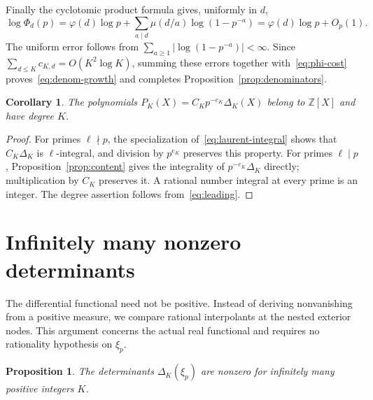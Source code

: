 \documentclass[11pt,letterpaper]{article}
\numberwithin{equation}{section}
\newtheorem{proposition}[theorem]{Proposition}
\newtheorem{corollary}[theorem]{Corollary}
\theoremstyle{remark}
\newcommand{\Z}{\mathbb Z}
\begin{document}
Finally the cyclotomic product formula gives, uniformly in $d$,
\begin{equation*}
 \log\Phi_d(p)=\varphi(d)\log p
    +\sum_{a\mid d}\mu(d/a)\log(1-p^{-a})
    =\varphi(d)\log p+O_p(1).
\end{equation*}
The uniform error follows from $\sum_{a\ge1}|\log(1-p^{-a})|<\infty$. Since $\sum_{d\le K}c_{K,d}=O(K^2\log K)$, summing these errors together with~\eqref{eq:phi-cost} proves~\eqref{eq:denom-growth} and completes Proposition~\ref{prop:denominators}.

\begin{corollary}\label{cor:integer-polys}
The polynomials $P_K(X)=C_Kp^{-e_K}\Delta_K(X)$ belong to $\Z[X]$ and have degree $K$.
\end{corollary}
\begin{proof}
For primes $\ell\nmid p$, the specialization of~\eqref{eq:laurent-integral} shows that $C_K\Delta_K$ is $\ell$-integral, and division by $p^{e_K}$ preserves this property. For primes $\ell\mid p$, Proposition~\ref{prop:content} gives the integrality of $p^{-e_K}\Delta_K$ directly; multiplication by $C_K$ preserves it. A rational number integral at every prime is an integer. The degree assertion follows from~\eqref{eq:leading}.
\end{proof}

\section{Infinitely many nonzero determinants}

The differential functional need not be positive. Instead of deriving nonvanishing from a positive measure, we compare rational interpolants at the nested exterior nodes. This argument concerns the actual real functional and requires no rationality hypothesis on $\xi_p$.

\begin{proposition}\label{prop:normality}
The determinants $\Delta_K(\xi_p)$ are nonzero for infinitely many positive integers $K$.
\end{proposition}
\end{document}
